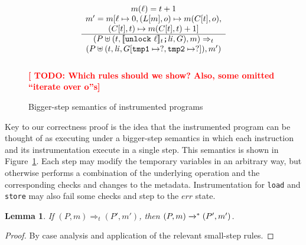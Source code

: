 \documentclass[preprint, 10pt]{sigplanconf}
\newcommand{\TODO}[1]{\textbf{\textcolor{red}{[ TODO: #1]}}}
\newcommand{\ignore}[1]{}
\newcommand{\meanl}{\ensuremath{[ \! [}}
\newcommand{\meanr}{\ensuremath{] \! ]}}
\newcommand{\means}[1]{\ensuremath{\meanl #1 \meanr}}
\newcommand{\unlock}[1]{\texttt{unlock}\ #1}
\newcommand{\spawn}[2]{\texttt{spawn}\ #1\ #2}
\newcommand{\wait}[1]{\texttt{wait}\ #1}
\newcommand{\instr}[2]{\ensuremath{\means{#2}_{#1}}}
\newcommand{\cfg}[2]{\ensuremath{(#1, #2)}}
\newcommand{\execstar}[4]{\ensuremath{\cfg{#1}{#2} \tto{#3} #4}}
\newcommand{\iexec}[4]{\ensuremath{\cfg{#1}{#2} \Rightarrow_{#3} #4}}
\newcommand{\tto}[1]{\mathrel{
  \vphantom{\xrightarrow{#1}}
  \smash{\xrightarrow{#1}}
  \vphantom{\to}^{*}}
}
\newtheorem{lemma}{Lemma}
\begin{document}
\begin{figure}[htb]
\[\begin{array}{c}
\multicolumn{1}{c}{m(\ell) = t + 1}
\\
\multicolumn{1}{c}{m' = m[\ell \mapsto 0, (L[m], o) \mapsto m(C[t], o),}
\\
\multicolumn{1}{c}{(C[t], t) \mapsto m(C[t], t) + 1]}
\\
\hline
\cfg{P \uplus (t, \instr{t}{\unlock{\ell}}\texttt{;} \mathit{li}, G)}{m}
\Rightarrow_{t} \\
\cfg{P \uplus (t, \mathit{li}, G[\texttt{tmp1} \mapsto ?, \texttt{tmp2} \mapsto ?])}{m'}
\\\\
\ignore{
\multicolumn{1}{c}{m' = m[(C[u], o) \mapsto \mathsf{max}(m(C[u], o), m(C[t], o)), (C[t], t) \mapsto m(C[t], t) + 1]}
\\
\hline
\cfg{P \uplus (t, \instr{t}{\spawn{u}{\mathit{li}'}}\texttt{;} \mathit{li}, G)}{m}
\Rightarrow_{t} \\
\cfg{P \uplus (t, \mathit{li}, G[\texttt{tmp1} \mapsto ?, \texttt{tmp2} \mapsto ?]) \uplus (u, \instr{u}{\mathit{li}'}, G_0)}{m'}
\\\\

\multicolumn{1}{c}{(u, \cdot, G_0) \in P}
\\
\multicolumn{1}{c}{m' = m[(C[t], o) \mapsto \mathsf{max}(m(C[t], o), m(C[u], o)), (C[u], u) \mapsto m(C[u], u) + 1]}
\\
\hline
\cfg{P \uplus (t, \instr{t}{\wait{u}}\texttt{;} \mathit{li}, G)}{m}
\Rightarrow_{t} \\
\cfg{P \uplus (t, \mathit{li}, G[\texttt{tmp1} \mapsto ?, \texttt{tmp2} \mapsto ?]}{m'}
}
\end{array}
\]
\TODO{Which rules should we show? Also, some omitted ``iterate over o''s}
\caption{Bigger-step semantics of instrumented programs}
\label{iexec}
\end{figure}
Key to our correctness proof is the idea that the instrumented program can be thought of as executing under a bigger-step semantics in which each instruction and its instrumentation execute in a single step. This semantics is shown in Figure~\ref{iexec}. Each step may modify the temporary variables in an arbitrary way, but otherwise performs a combination of the underlying operation and the corresponding checks and changes to the metadata. Instrumentation for \texttt{load} and \texttt{store} may also fail some checks and step to the $\mathit{err}$ state.
\begin{lemma}\label{iexec-exec}If $\iexec{P}{m}{t}{(P', m')}$, then $\execstar{P}{m}{}{(P', m')}$.\end{lemma}
\begin{proof}By case analysis and application of the relevant small-step rules.\end{proof}
\end{document}
